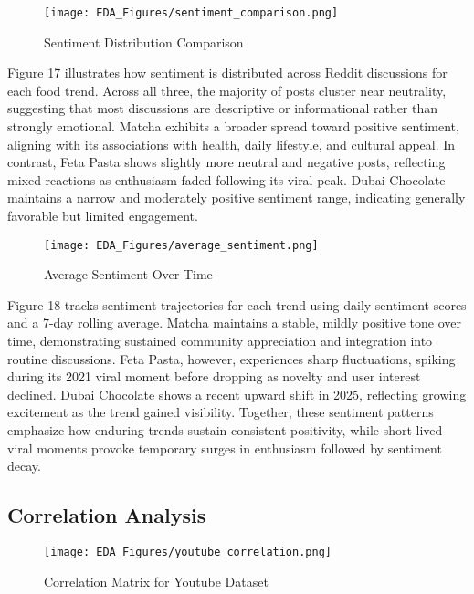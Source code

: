 \documentclass{article}
\begin{document}
\begin{figure}[H]
    \centering
    \texttt{[image: EDA\_Figures/sentiment\_comparison.png]}
    \caption{Sentiment Distribution Comparison}
    \label{fig:sentiment_comparison}
\end{figure}

Figure 17 illustrates how sentiment is distributed across Reddit discussions for each food trend. Across all three, the majority of posts cluster near neutrality, suggesting that most discussions are descriptive or informational rather than strongly emotional. Matcha exhibits a broader spread toward positive sentiment, aligning with its associations with health, daily lifestyle, and cultural appeal. In contrast, Feta Pasta shows slightly more neutral and negative posts, reflecting mixed reactions as enthusiasm faded following its viral peak. Dubai Chocolate maintains a narrow and moderately positive sentiment range, indicating generally favorable but limited engagement.

\begin{figure}[H]
    \centering
    \texttt{[image: EDA\_Figures/average\_sentiment.png]}
    \caption{Average Sentiment Over Time}
    \label{fig:average_sentiment}
\end{figure}

Figure 18 tracks sentiment trajectories for each trend using daily sentiment scores and a 7-day rolling average. Matcha maintains a stable, mildly positive tone over time, demonstrating sustained community appreciation and integration into routine discussions. Feta Pasta, however, experiences sharp fluctuations, spiking during its 2021 viral moment before dropping as novelty and user interest declined. Dubai Chocolate shows a recent upward shift in 2025, reflecting growing excitement as the trend gained visibility. Together, these sentiment patterns emphasize how enduring trends sustain consistent positivity, while short-lived viral moments provoke temporary surges in enthusiasm followed by sentiment decay.


\subsection{Correlation Analysis}

\begin{figure}[H]
    \centering
    \texttt{[image: EDA\_Figures/youtube\_correlation.png]}
    \caption{Correlation Matrix for Youtube Dataset}
    \label{fig:youtube_correlation}
\end{figure}
\end{document}
